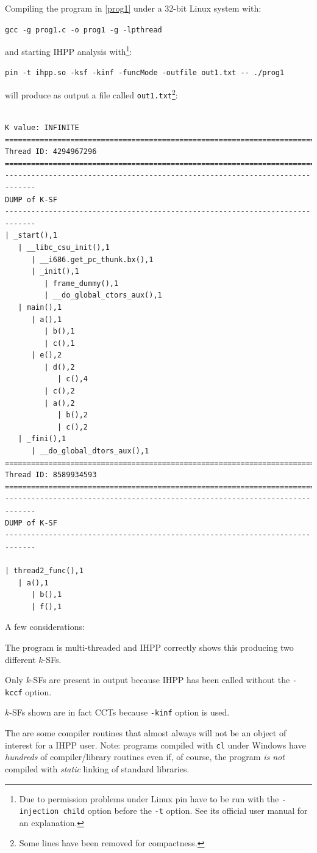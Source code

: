 \documentclass[a4paper,10pt]{report}
\begin{document}
\noindent
Compiling the program in \cref{prog1} under a 32-bit Linux system with:
\begin{center}
\verb|gcc -g prog1.c -o prog1 -g -lpthread|
\end{center}
and starting IHPP analysis with\footnote{Due to permission problems under Linux pin have to be run with the \texttt{-injection child} option before the \texttt{-t} option. See its official user manual for an explanation.}:
\begin{center}
\begin{verbatim}
pin -t ihpp.so -ksf -kinf -funcMode -outfile out1.txt -- ./prog1
\end{verbatim}
\end{center}

\noindent
will produce as output a file called \verb|out1.txt|\footnote{Some lines have been removed for compactness.}:

\begin{lstlisting}[label=out1, caption=file out1.txt]

K value: INFINITE
=============================================================================
Thread ID: 4294967296
=============================================================================
-----------------------------------------------------------------------------
DUMP of K-SF
-----------------------------------------------------------------------------
| _start(),1
   | __libc_csu_init(),1
      | __i686.get_pc_thunk.bx(),1
      | _init(),1
         | frame_dummy(),1
         | __do_global_ctors_aux(),1
   | main(),1
      | a(),1
         | b(),1
         | c(),1
      | e(),2
         | d(),2
            | c(),4
         | c(),2
         | a(),2
            | b(),2
            | c(),2
   | _fini(),1
      | __do_global_dtors_aux(),1
=============================================================================
Thread ID: 8589934593
=============================================================================
-----------------------------------------------------------------------------
DUMP of K-SF
-----------------------------------------------------------------------------

| thread2_func(),1
   | a(),1
      | b(),1
      | f(),1
\end{lstlisting}


A few considerations:
\renewcommand{\labelitemi}{$-$}

\begin{itemize*}
\item The program is multi-threaded and IHPP correctly shows this 
producing two different $k$-SFs. 
\item Only $k$-SFs are present in output because IHPP has been called without the \verb|-kccf| option.
\item $k$-SFs shown are in fact CCTs because \verb|-kinf| option is used.
\item The are some compiler routines that almost always will not be an object of interest for a IHPP user. Note: programs compiled with \verb|cl| under Windows have \emph{hundreds} of compiler\slash library routines even if, of course, the program \emph{is not} compiled with \emph{static} linking of standard libraries. 
\end{itemize*}
\end{document}
